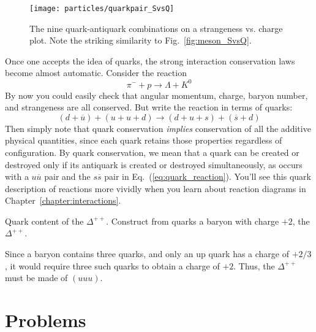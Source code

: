 \begin{figure}[!bp]
\begin{center}
\texttt{[image: particles/quarkpair\_SvsQ]}
\caption{The nine quark-antiquark combinations on a strangeness
  vs. charge plot.  Note the striking similarity to
  Fig.~\protect\ref{fig:meson_SvsQ}.}
\label{fig:quarkpair_SvsQ}
\end{center}
\end{figure}

Once one accepts the idea of quarks, the strong interaction
conservation laws become almost automatic.  Consider the reaction
\begin{equation}
\pi^- + p \to \Lambda + K^0
\end{equation}
By now you could easily check that angular momentum, charge,
baryon number, and strangeness are all conserved.  But write the
reaction in terms of quarks:
\begin{equation}
(d+\overline u) + (u+u+d) \to (d+u+s) + (\overline s+d)
\label{eq:quark_reaction}
\end{equation}
Then simply note that quark conservation {\em implies}
conservation of all the additive physical quantities, since each
quark retains those properties regardless of configuration.  By
quark conservation, we mean that a quark can be created or
destroyed only if its antiquark is created or destroyed
simultaneously, as occurs with a $u\overline u$ pair and the
$s\overline s$ pair in Eq.~(\ref{eq:quark_reaction}).  You'll see
this quark description of reactions more vividly when you learn
about reaction diagrams in Chapter~\ref{chapter:interactions}.

\begin{example}{Quark content of the $\Delta^{++}$.}
\label{ex:delta}
Construct from quarks a baryon with charge $+2$, the
$\Delta^{++}$.
\begin{solution}
Since a baryon contains three quarks,
and only an up quark has a charge of $+2/3$, it would require
three such quarks to obtain a charge of $+2$.  Thus, the
$\Delta^{++}$ must be made of $(uuu)$.
\end{solution}
\end{example}

\newpage

\section*{Problems}
\label{sec:particles:problems}

